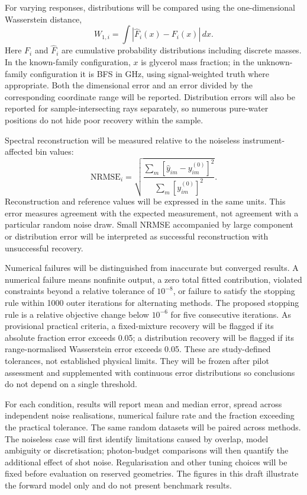 \documentclass[11pt]{article}
\begin{document}
For varying responses, distributions will be compared using the one-dimensional Wasserstein distance,
\begin{equation}
 W_{1,i}=\int|\widehat F_i(x)-F_i(x)|\,dx.
 \label{eq:wasserstein}
\end{equation}
Here $F_i$ and $\widehat F_i$ are cumulative probability distributions including discrete masses. In the known-family configuration, $x$ is glycerol mass fraction; in the unknown-family configuration it is BFS in GHz, using signal-weighted truth where appropriate. Both the dimensional error and an error divided by the corresponding coordinate range will be reported. Distribution errors will also be reported for sample-intersecting rays separately, so numerous pure-water positions do not hide poor recovery within the sample.

Spectral reconstruction will be measured relative to the noiseless instrument-affected bin values:
\begin{equation}
 \mathrm{NRMSE}_i=
 \sqrt{\frac{\sum_m[\widehat y_{im}-y^{(0)}_{im}]^2}
 {\sum_m[y^{(0)}_{im}]^2}}.
 \label{eq:spectral_nrmse}
\end{equation}
Reconstruction and reference values will be expressed in the same units. This error measures agreement with the expected measurement, not agreement with a particular random noise draw. Small NRMSE accompanied by large component or distribution error will be interpreted as successful reconstruction with unsuccessful recovery.

Numerical failures will be distinguished from inaccurate but converged results. A numerical failure means nonfinite output, a zero total fitted contribution, violated constraints beyond a relative tolerance of $10^{-8}$, or failure to satisfy the stopping rule within 1000 outer iterations for alternating methods. The proposed stopping rule is a relative objective change below $10^{-6}$ for five consecutive iterations. As provisional practical criteria, a fixed-mixture recovery will be flagged if its absolute fraction error exceeds 0.05; a distribution recovery will be flagged if its range-normalised Wasserstein error exceeds 0.05. These are study-defined tolerances, not established physical limits. They will be frozen after pilot assessment and supplemented with continuous error distributions so conclusions do not depend on a single threshold.

For each condition, results will report mean and median error, spread across independent noise realisations, numerical failure rate and the fraction exceeding the practical tolerance. The same random datasets will be paired across methods. The noiseless case will first identify limitations caused by overlap, model ambiguity or discretisation; photon-budget comparisons will then quantify the additional effect of shot noise. Regularisation and other tuning choices will be fixed before evaluation on reserved geometries. The figures in this draft illustrate the forward model only and do not present benchmark results.
\end{document}
